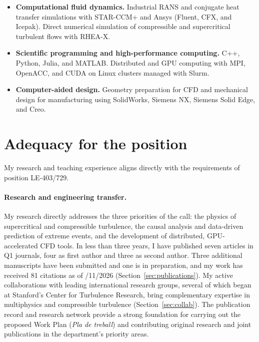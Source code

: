 \documentclass[11pt]{article}
\newcommand{\NEW}[1]{\iffinal #1\else{\color{red}#1}\fi} %
\begin{document}
\begin{itemize}[itemsep=2pt]
	\item \textbf{Computational fluid dynamics.} Industrial RANS and
	conjugate heat transfer simulations with STAR-CCM+ and Ansys (Fluent,
	CFX, and Icepak). Direct numerical simulation of compressible and
	supercritical turbulent flows with RHEA-X.
	\item \textbf{Scientific programming and high-performance computing.}
	C++, Python, Julia, and MATLAB. Distributed and GPU computing with
	MPI, OpenACC, and CUDA on Linux clusters managed with Slurm.
	\item \textbf{Computer-aided design.} Geometry preparation for CFD and
	mechanical design for manufacturing using SolidWorks, Siemens NX,
	Siemens Solid Edge, and Creo.
\end{itemize}


\section{Adequacy for the position}\label{sec:adequacy}

My research and teaching experience aligns directly with the requirements of position LE-403/729. 

\paragraph{Research and engineering transfer.}

My research directly addresses the three priorities of the call: the physics of supercritical and compressible turbulence, the causal analysis and data-driven prediction of extreme events, and the development of distributed, GPU-accelerated CFD tools. 
In less than three years, I \NEW{have} published seven articles in Q1 journals, four as first author and three as second author. 
Three additional manuscripts have been submitted and one is in preparation, and my work has received 81 citations as of \NEW{11/11/2026} (Section~\ref{sec:publications}).
My active collaborations with leading international research groups, several of which began at Stanford's Center for Turbulence Research, bring complementary expertise in multiphysics and compressible turbulence (Section~\ref{sec:collab}). 
The publication record and research network provide a strong foundation for carrying out the proposed Work Plan (\textit{Pla de treball}) and contributing original research and joint
publications in the department's priority areas.
\end{document}
